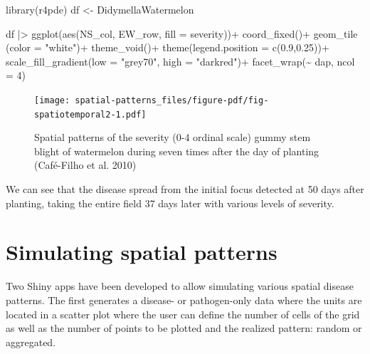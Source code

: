 \documentclass[
  letterpaper,
]{book}
\newenvironment{Shaded}{\begin{snugshade}}{\end{snugshade}}
\newcommand{\AttributeTok}[1]{\textcolor[rgb]{0.40,0.45,0.13}{#1}}
\newcommand{\DecValTok}[1]{\textcolor[rgb]{0.68,0.00,0.00}{#1}}
\newcommand{\FloatTok}[1]{\textcolor[rgb]{0.68,0.00,0.00}{#1}}
\newcommand{\FunctionTok}[1]{\textcolor[rgb]{0.28,0.35,0.67}{#1}}
\newcommand{\NormalTok}[1]{\textcolor[rgb]{0.00,0.23,0.31}{#1}}
\newcommand{\OtherTok}[1]{\textcolor[rgb]{0.00,0.23,0.31}{#1}}
\newcommand{\SpecialCharTok}[1]{\textcolor[rgb]{0.37,0.37,0.37}{#1}}
\newcommand{\StringTok}[1]{\textcolor[rgb]{0.13,0.47,0.30}{#1}}
\begin{document}
\begin{Shaded}
\begin{Highlighting}[]
\FunctionTok{library}\NormalTok{(r4pde)}
\NormalTok{df }\OtherTok{\textless{}{-}}\NormalTok{ DidymellaWatermelon}

\NormalTok{df }\SpecialCharTok{|\textgreater{}} 
  \FunctionTok{ggplot}\NormalTok{(}\FunctionTok{aes}\NormalTok{(NS\_col, EW\_row, }\AttributeTok{fill =}\NormalTok{ severity))}\SpecialCharTok{+}
  \FunctionTok{coord\_fixed}\NormalTok{()}\SpecialCharTok{+}
  \FunctionTok{geom\_tile}\NormalTok{ (}\AttributeTok{color =} \StringTok{"white"}\NormalTok{)}\SpecialCharTok{+}
  \FunctionTok{theme\_void}\NormalTok{()}\SpecialCharTok{+}
  \FunctionTok{theme}\NormalTok{(}\AttributeTok{legend.position =} \FunctionTok{c}\NormalTok{(}\FloatTok{0.9}\NormalTok{,}\FloatTok{0.25}\NormalTok{))}\SpecialCharTok{+}
 \FunctionTok{scale\_fill\_gradient}\NormalTok{(}\AttributeTok{low =} \StringTok{"grey70"}\NormalTok{, }\AttributeTok{high =} \StringTok{"darkred"}\NormalTok{)}\SpecialCharTok{+}
  \FunctionTok{facet\_wrap}\NormalTok{(}\SpecialCharTok{\textasciitilde{}}\NormalTok{ dap, }\AttributeTok{ncol =} \DecValTok{4}\NormalTok{)}
\end{Highlighting}
\end{Shaded}

\begin{figure}[H]

{\centering \texttt{[image: spatial-patterns\_files/figure-pdf/fig-spatiotemporal2-1.pdf]}

}

\caption{\label{fig-spatiotemporal2}Spatial patterns of the severity
(0-4 ordinal scale) gummy stem blight of watermelon during seven times
after the day of planting (Café-Filho et al. 2010)}

\end{figure}

We can see that the disease spread from the initial focus detected at 50
days after planting, taking the entire field 37 days later with various
levels of severity.

\hypertarget{simulating-spatial-patterns}{%
\section{Simulating spatial
patterns}\label{simulating-spatial-patterns}}

Two Shiny apps have been developed to allow simulating various spatial
disease patterns. The first generates a disease- or pathogen-only data
where the units are located in a scatter plot where the user can define
the number of cells of the grid as well as the number of points to be
plotted and the realized pattern: random or aggregated.
\end{document}
